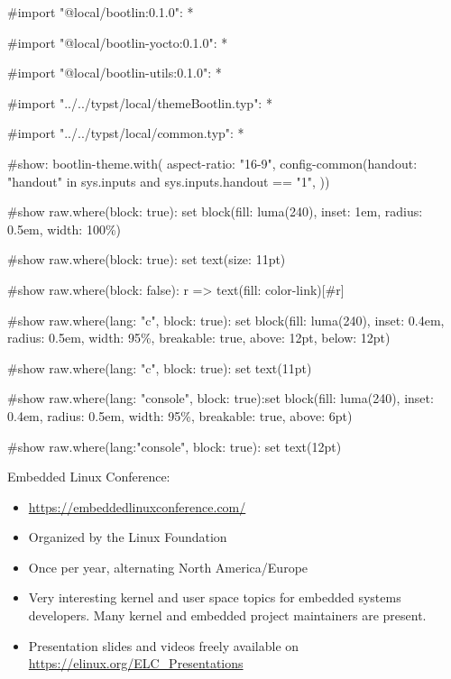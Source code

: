 #import "@local/bootlin:0.1.0": *

#import "@local/bootlin-yocto:0.1.0": *

#import "@local/bootlin-utils:0.1.0": *

#import "../../typst/local/themeBootlin.typ": *

#import "../../typst/local/common.typ": *

#show: bootlin-theme.with( aspect-ratio: "16-9", config-common(handout: "handout" in sys.inputs and sys.inputs.handout == "1", ))

#show raw.where(block: true): set block(fill: luma(240), inset: 1em, radius: 0.5em, width: 100\%)

#show raw.where(block: true): set text(size: 11pt)

#show raw.where(block: false): r => text(fill: color-link)[#r]

#show raw.where(lang: "c", block: true): set block(fill: luma(240), inset: 0.4em, radius: 0.5em, width: 95\%, breakable: true, above: 12pt, below: 12pt)

#show raw.where(lang: "c", block: true): set text(11pt)

#show raw.where(lang: "console", block: true):set block(fill: luma(240), inset: 0.4em, radius: 0.5em, width: 95\%, breakable: true, above: 6pt)

#show raw.where(lang:"console", block: true): set text(12pt)

 \item Embedded Linux Conference:
  \begin{itemize}
  \item \url{https://embeddedlinuxconference.com/}
  \item Organized by the Linux Foundation
  \item Once per year, alternating North America/Europe
  \item Very interesting kernel and user space topics for embedded
        systems developers. Many kernel and embedded project maintainers are present.
  \item Presentation slides and videos freely available on
    \url{https://elinux.org/ELC_Presentations} 
  \end{itemize}
